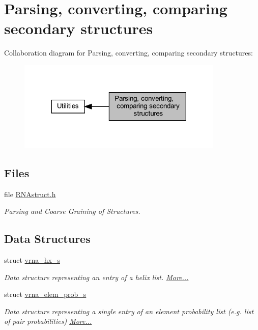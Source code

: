 \hypertarget{group__struct__utils}{}\section{Parsing, converting, comparing secondary structures}
\label{group__struct__utils}
Collaboration diagram for Parsing, converting, comparing secondary structures\+:
\nopagebreak
\begin{figure}[H]
\begin{center}
\leavevmode
\includegraphics[width=278pt]{group__struct__utils}
\end{center}
\end{figure}
\subsection*{Files}
\begin{DoxyCompactItemize}
\item 
file \hyperlink{RNAstruct_8h}{R\+N\+Astruct.\+h}
\begin{DoxyCompactList}\small\item\em Parsing and Coarse Graining of Structures. \end{DoxyCompactList}\end{DoxyCompactItemize}
\subsection*{Data Structures}
\begin{DoxyCompactItemize}
\item 
struct \hyperlink{group__struct__utils_structvrna__hx__s}{vrna\+\_\+hx\+\_\+s}
\begin{DoxyCompactList}\small\item\em Data structure representing an entry of a helix list.  \hyperlink{group__struct__utils_structvrna__hx__s}{More...}\end{DoxyCompactList}\item 
struct \hyperlink{group__struct__utils_structvrna__elem__prob__s}{vrna\+\_\+elem\+\_\+prob\+\_\+s}
\begin{DoxyCompactList}\small\item\em Data structure representing a single entry of an element probability list (e.\+g. list of pair probabilities)  \hyperlink{group__struct__utils_structvrna__elem__prob__s}{More...}\end{DoxyCompactList}\end{DoxyCompactItemize}
